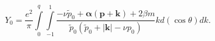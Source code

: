 \begin{equation}
\label{eq5}
Y_0 = \frac{e^2}\pi\int\limits_0^q \int\limits_{-1}^1
\frac
{-\nu\tilde{p}_0 + {\bm \alpha}(\bm{p} + \bm{k}) + 2\beta m}
{\tilde{p}_0 (\tilde{p}_0 + |{\bm k}| - \nu p_0)}
k d(\cos\theta)dk.
\end{equation}

